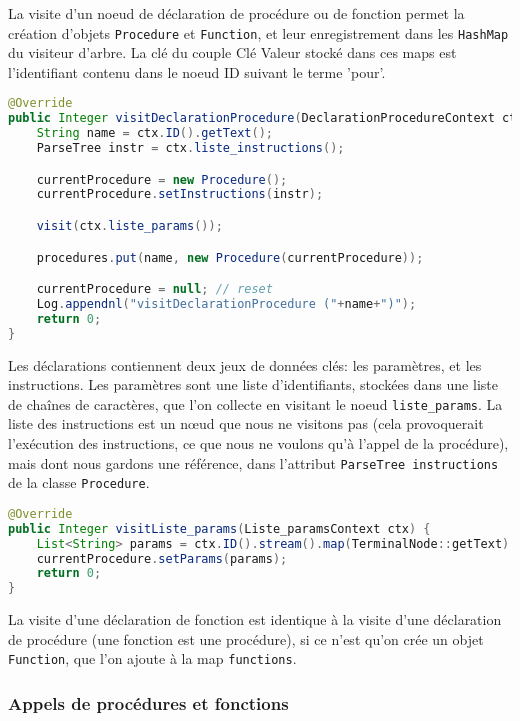 \documentclass[a4paper,11pt]{article}
\begin{document}
La visite d'un noeud de déclaration de procédure ou de fonction permet la création d'objets \lstinline$Procedure$ et \lstinline$Function$, et leur enregistrement dans les \lstinline$HashMap$ du visiteur d'arbre. La clé du couple Clé Valeur stocké dans ces maps est l'identifiant contenu dans le noeud ID suivant le terme 'pour'.

\begin{lstlisting}[language=Java]
@Override
public Integer visitDeclarationProcedure(DeclarationProcedureContext ctx) {
    String name = ctx.ID().getText();
    ParseTree instr = ctx.liste_instructions();

    currentProcedure = new Procedure();
    currentProcedure.setInstructions(instr);

    visit(ctx.liste_params());

    procedures.put(name, new Procedure(currentProcedure));

    currentProcedure = null; // reset
    Log.appendnl("visitDeclarationProcedure ("+name+")");
    return 0;
}
\end{lstlisting}

Les déclarations contiennent deux jeux de données clés: les paramètres, et les instructions. Les paramètres sont une liste d'identifiants, stockées dans une liste de chaînes de caractères, que l'on collecte en visitant le noeud \lstinline$liste_params$. La liste des instructions est un nœud que nous ne visitons pas (cela provoquerait l'exécution des instructions, ce que nous ne voulons qu'à l'appel de la procédure), mais dont nous gardons une référence, dans l'attribut \lstinline$ParseTree instructions$ de la classe \lstinline$Procedure$.

\begin{lstlisting}[language=Java]
@Override
public Integer visitListe_params(Liste_paramsContext ctx) {
    List<String> params = ctx.ID().stream().map(TerminalNode::getText).collect(Collectors.toList());
    currentProcedure.setParams(params);
    return 0;
}
\end{lstlisting}

La visite d'une déclaration de fonction est identique à la visite d'une déclaration de procédure (une fonction est une procédure), si ce n'est qu'on crée un objet \lstinline$Function$, que l'on ajoute à la map \lstinline$functions$.

\subsubsection{Appels de procédures et fonctions}

\end{document}

